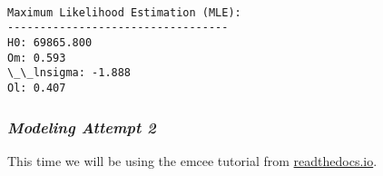 \documentclass[11pt]{article}
\begin{document}
    \begin{Verbatim}[commandchars=\\\{\}]

Maximum Likelihood Estimation (MLE):
----------------------------------
H0: 69865.800
Om: 0.593
\_\_lnsigma: -1.888
Ol: 0.407
    \end{Verbatim}

    \hypertarget{modeling-attempt-2}{%
\subsubsection{\texorpdfstring{\emph{Modeling Attempt
2}}{Modeling Attempt 2}}\label{modeling-attempt-2}}

This time we will be using the emcee tutorial from
\href{https://emcee.readthedocs.io/en/stable/tutorials/line/}{readthedocs.io}.
\end{document}
